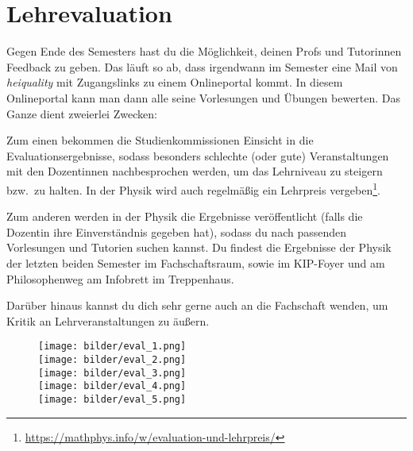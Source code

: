 \section{Lehrevaluation}
\label{eval}

Gegen Ende des Semesters hast du die Möglichkeit, deinen Profs und Tutorinnen Feedback zu geben. Das läuft so ab, dass irgendwann im Semester eine Mail von \textit{heiquality} mit Zugangslinks zu einem Onlineportal kommt. In diesem Onlineportal kann man dann alle seine Vorlesungen und Übungen bewerten.
Das Ganze dient zweierlei Zwecken:

Zum einen bekommen die Studienkommissionen Einsicht in die Evaluationsergebnisse, sodass besonders schlechte (oder gute) Veranstaltungen mit den Dozentinnen nachbesprochen werden, um das Lehrniveau zu steigern bzw.\ zu halten. In der Physik wird auch regelmäßig ein Lehrpreis vergeben\footnote{\url{https://mathphys.info/w/evaluation-und-lehrpreis/}}.

Zum anderen werden in der Physik die Ergebnisse veröffentlicht (falls die Dozentin ihre Einverständnis gegeben hat), sodass du nach passenden Vorlesungen und Tutorien suchen kannst. Du findest die Ergebnisse der Physik der letzten beiden Semester \zB im Fachschaftsraum, sowie im \gls{KIP}-Foyer und am Philosophenweg am Infobrett im Treppenhaus.

Darüber hinaus kannst du dich sehr gerne auch an die Fachschaft wenden, um Kritik an Lehrveranstaltungen zu äußern.

\begin{figure}[h]
    \begin{center}
        \texttt{[image: bilder/eval\_1.png]}\\
        \texttt{[image: bilder/eval\_2.png]}\\
        \texttt{[image: bilder/eval\_3.png]}\\
        \texttt{[image: bilder/eval\_4.png]}\\
        \texttt{[image: bilder/eval\_5.png]}\\
    \end{center}
\end{figure}
